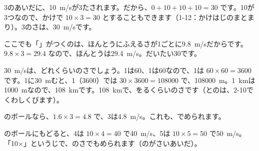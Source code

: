 3のあいだに、\qty{10}{m/s}が3たされます。だから、$0+10+10+10=30$ です。10が3つなので、かけで $10\times3=30$ とすることもできます（1-12：かけはじのまとまり）。3のさは、\qty{30}{m/s}です。

ここでも「」がつくのは、ほんとうにふえるさが1ごとに\qty{9.8}{m/s}だからです。$9.8\times3=29.4$ なので、ほんとうは\qty{29.4}{m/s}。だいたい30です。

\par\vspace{1mm}
\noindent\begin{minipage}[c]{0.70\linewidth}
\qty{30}{m/s}は、どれくらいのさでしょう。1は60、1は60なので、1は $60\times60=3600$です。1に\qty{30}{m}むと、1（3600）では $30\times3600=108000$ で、\qty{108000}{m}。\qty{1}{km}は\qty{1000}{m}なので、\qty{108}{km}です。\qty{108}{km}で、をるくらいのさです（とのは、2-10でくわしくびます）。
\end{minipage}\hfill
\begin{minipage}[c]{0.27\linewidth}\centering
{}
\end{minipage}

\par\vspace{1mm}
のボールなら、$1.6\times3=4.8$ で、3は\qty{4.8}{m/s}。これも、でめられます。

のボールにもどると、4は $10\times4=40$ で\qty{40}{m/s}、5は $10\times5=50$ で\qty{50}{m/s}。「10×」というじで、のさでもめられます（のがさいあいだ）。

